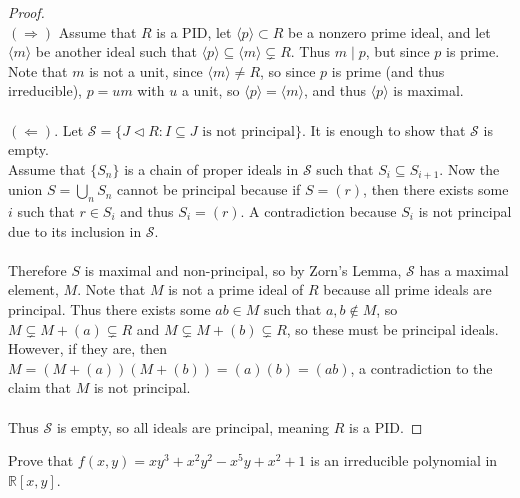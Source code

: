 \documentclass{article}
\newenvironment{problem}[2][Problem]{\begin{trivlist}
\item[\hskip \labelsep {\bfseries #1}\hskip \labelsep {\bfseries #2.}]}{\end{trivlist}}
\newcommand{\set}[1]{\{ #1 \}}
\newcommand{\ang}[1]{\langle #1 \rangle}
\begin{document}
\begin{proof} ~ \\
  $(\Longrightarrow)$
  Assume that $R$ is a PID, let $\ang p \subset R$ be a
  nonzero prime ideal, and let $\ang m$ be another ideal such that
  $\ang p \subseteq \ang m \subsetneq R$. Thus $m \mid p$, but since $p$ is
  prime. Note that $m$ is not a unit, since $\ang m \neq R$, so since $p$ is
  prime (and thus irreducible), $p = um$ with $u$ a unit, so $\ang p = \ang m$,
  and thus $\ang p$ is maximal.
%
  \\~\\
  $(\Longleftarrow)$.
  Let $\mathcal S = \set{J \triangleleft R : I \subseteq J \text{ is not principal}}$.
  It is enough to show that $\mathcal S$ is empty.\\
  Assume that $\set {S_n}$ is a chain of proper ideals in $\mathcal S$ such that
  $S_i \subseteq S_{i+1}$.
  Now the union $S = \bigcup_n S_n$ cannot be principal
  because if $S = (r)$, then there exists some $i$ such that $r \in S_i$ and
  thus $S_i = (r)$. A contradiction because $S_i$ is not principal due to its
  inclusion in $\mathcal S$.
  \\~\\
  Therefore $S$ is maximal and non-principal, so by Zorn's Lemma, $\mathcal S$
  has a maximal element, $M$. Note that $M$ is not a prime ideal of $R$ because
  all prime ideals are principal. Thus there exists some $ab \in M$ such that
  $a, b \not\in M$, so $M \subsetneq M + (a) \subsetneq R$ and
  $M \subsetneq M + (b) \subsetneq R$, so these must be principal ideals.
  However, if they are, then $M = (M + (a))(M + (b)) = (a)(b) = (ab)$, a
  contradiction to the claim that $M$ is not principal.
  \\~\\
  Thus $\mathcal S$ is empty, so all ideals are principal, meaning $R$ is a PID.
\end{proof}
\pagebreak
\begin{problem}{5.23}
  Prove that $f(x, y) = xy^3 + x^2y^2 - x^5y + x^2 + 1$ is an irreducible
  polynomial in $\mathbb R[x, y]$.
\end{problem}
\end{document}
